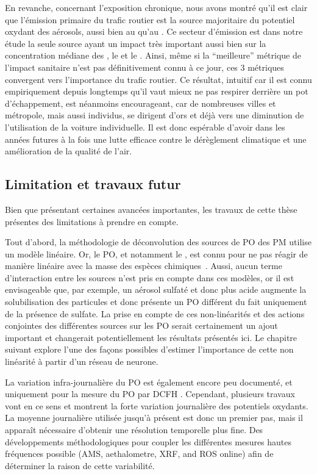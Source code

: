 En revanche, concernant l'exposition chronique, nous avons montré qu'il est clair que
l'émission primaire du trafic routier est la source majoritaire du potentiel oxydant des
aérosols, aussi bien au \POAA{} qu'au \PODTT. Ce secteur d'émission est dans notre étude
la seule source ayant un impact très important aussi bien sur la concentration médiane des
\PMdix{}, le \POAAv{} et le \PODTTv.
Ainsi, même si la ``meilleure'' métrique de l'impact sanitaire n'est pas définitivement
connu à ce jour, ces 3 métriques convergent vers l'importance du trafic routier. Ce
résultat, intuitif car il est connu empiriquement depuis longtemps qu'il vaut mieux ne
pas respirer derrière un pot d'échappement, est néanmoins encourageant, car de nombreuses
villes et métropole, mais aussi individus, se dirigent d'ors et déjà vers une diminution
de l'utilisation de la voiture individuelle. Il est donc espérable d'avoir dans les années
futures à la fois une lutte efficace contre le dérèglement climatique et une amélioration
de la qualité de l'air.

\subsection{Limitation et travaux futur}%
\label{sub:limitation_et_travaux_futur}

Bien que présentant certaines avancées importantes, les travaux de cette thèse présentes
des limitations à prendre en compte.

Tout d'abord, la méthodologie de déconvolution des sources de PO des PM utilise un modèle
linéaire. Or, le PO, et notamment le \PODTT, est connu pour ne pas réagir de manière
linéaire avec la masse des espèces
chimiques~\autocite{charrierDithiothreitol2012,sauvainComparison2013,charrierRates2015,charrierBias2016,calasImportance2017}.
Aussi, aucun
terme d'interaction entre les sources n'est pris en compte dans ces modèles, or il est
envisageable que, par exemple, un aérosol sulfaté et donc plus acide augmente la
solubilisation des particules et donc présente un PO différent du fait uniquement de la
présence de sulfate.  La prise en compte de ces non-linéarités et des actions conjointes
des différentes sources sur les PO serait certainement un ajout important et changerait
potentiellement les résultats présentés ici. Le chapitre suivant explore l'une des façons
possibles d'estimer l'importance de cette non linéarité à partir d'un réseau de neurone.

La variation infra-journalière du PO est également encore peu documenté, et uniquement
pour la mesure du PO par DCFH \autocite{venkatachariMeasurement2005,costabileFirst2017}.
Cependant, plusieurs travaux vont en ce sens
\autocite{zhouDevelopment2018,jovanovicMeasurements2019} et montrent la forte variation
journalière des potentiels oxydants.  La moyenne journalière utilisée jusqu'à présent est
donc un premier pas, mais il apparaît nécessaire d'obtenir une résolution temporelle plus
fine.  Des développements méthodologiques pour coupler les différentes mesures hautes
fréquences possible (AMS, aethalometre, XRF, and ROS online) afin de déterminer la raison
de cette variabilité.

